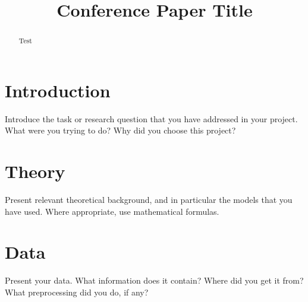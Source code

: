 \documentclass[conference]{IEEEtran}
\begin{document}
\title{Conference Paper Title}


\author{
}

\maketitle

\begin{abstract}
Test
\end{abstract}

\section{Introduction}
Introduce the task or research question that you have addressed in
your project. What were you trying to do? Why did you choose this project?

\section{Theory}
Present relevant theoretical background, and in particular the models that
you have used. Where appropriate, use mathematical formulas.

\section{Data}
Present your data. What information does it contain? Where did you get it
from? What preprocessing did you do, if any?
\end{document}
